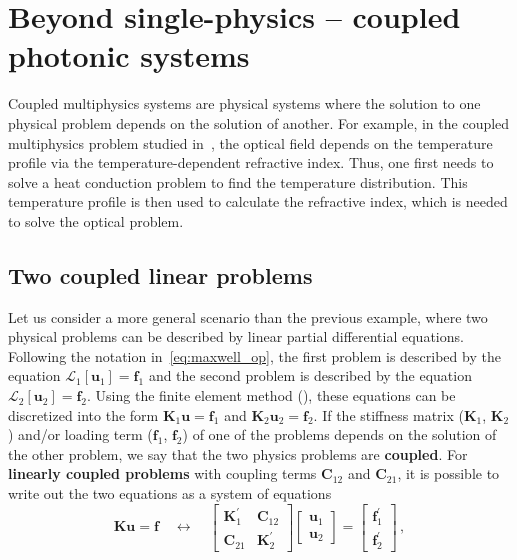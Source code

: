  \section{Beyond single-physics -- coupled photonic systems}\label{sec:coupled}

 Coupled multiphysics systems are physical systems where the solution to one physical 
 problem depends on the solution of another. For example, in the coupled multiphysics 
 problem studied in~\cite{ownpub0}, the optical field depends on the temperature profile via
 the temperature-dependent refractive index. Thus, one first needs to solve a heat conduction problem to find the temperature distribution. 
 This temperature profile is then used to calculate the refractive index, which is needed to solve the optical problem.
    \subsection*{Two coupled linear problems}
 Let us consider a more general scenario than the previous example, where two physical
 problems can be described by linear partial differential equations. Following the notation in~\eqref{eq:maxwell_op}, the
 first problem
 is described by the equation $\mathcal{L}_1 [\mathbf{u}_1]= \mathbf{f}_1$ and
 the second problem is described by the
 equation $\mathcal{L}_2 [\mathbf{u}_2]= \mathbf{f}_2$. Using the finite element method (), these equations can be
 discretized into the form $\mathbf{K}_1 \mathbf{u} = \mathbf{f}_1$ and $\mathbf{K}_2 \mathbf{u}_2 =
\mathbf{f}_2$.
 If the stiffness matrix ($\mathbf{K}_1$, $\mathbf{K}_2$) and/or loading term ($\mathbf{f}_1$, $\mathbf{f}_2$) of one of the problems depends on the solution of the
 other problem, we say that the two physics problems are
    \textbf{coupled}. For \textbf{linearly coupled problems} with coupling terms $\mathbf{C}_{12}$ and $\mathbf{C}_{21}$, it is possible to write out the two equations as a system of equations
    \begin{equation}\label{eq:c_N_2}
 \mathbf{K} \mathbf{u} = \mathbf{f} \quad \longleftrightarrow \quad 
        \begin{bmatrix}
 \mathbf{K}^\prime_1  & \mathbf{C}_{12} \\
 \mathbf{C}_{21} & \mathbf{K}^\prime_2
        \end{bmatrix}
        \begin{bmatrix}
 \mathbf{u}_1 \\
 \mathbf{u}_2
        \end{bmatrix}
 =
        \begin{bmatrix}
 \mathbf{f}_1^\prime \\
 \mathbf{f}_2^\prime
        \end{bmatrix}\,,
    \end{equation}
